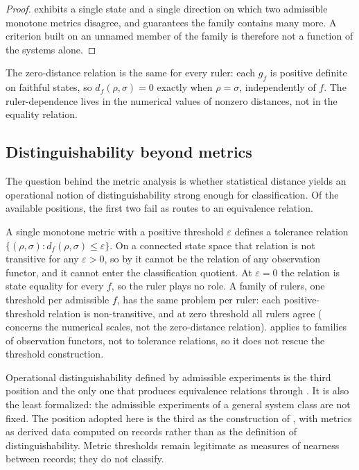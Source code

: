 \documentclass[11pt,letterpaper]{article}
\theoremstyle{definition}
\theoremstyle{remark}
\begin{document}
\begin{proof}
 exhibits a single state and a single direction on which two admissible monotone metrics disagree, and  guarantees the family contains many more. A criterion built on an unnamed member of the family is therefore not a function of the systems alone.
\end{proof}

The zero-distance relation is the same for every ruler: each $g_f$ is positive definite on faithful states, so $d_f(\rho, \sigma) = 0$ exactly when $\rho = \sigma$, independently of $f$. The ruler-dependence lives in the numerical values of nonzero distances, not in the equality relation.

\subsection{Distinguishability beyond metrics}

The question behind the metric analysis is whether statistical distance yields an operational notion of distinguishability strong enough for classification. Of the available positions, the first two fail as routes to an equivalence relation.

A single monotone metric with a positive threshold $\varepsilon$ defines a tolerance relation $\{(\rho,\sigma) : d_f(\rho,\sigma) \le \varepsilon\}$. On a connected state space that relation is not transitive for any $\varepsilon > 0$, so by  it cannot be the relation of any observation functor, and it cannot enter the classification quotient. At $\varepsilon = 0$ the relation is state equality for every $f$, so the ruler plays no role. A family of rulers, one threshold per admissible $f$, has the same problem per ruler: each positive-threshold relation is non-transitive, and at zero threshold all rulers agree ( concerns the numerical scales, not the zero-distance relation).  applies to families of observation functors, not to tolerance relations, so it does not rescue the threshold construction.

Operational distinguishability defined by admissible experiments is the third position and the only one that produces equivalence relations through . It is also the least formalized: the admissible experiments of a general system class are not fixed. The position adopted here is the third as the construction of , with metrics as derived data computed on records rather than as the definition of distinguishability. Metric thresholds remain legitimate as measures of nearness between records; they do not classify.
\end{document}
